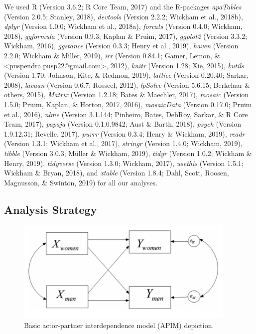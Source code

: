 \documentclass[
  man]{apa6}
\begin{document}
We used R (Version 3.6.2; R Core Team, 2017) and the R-packages \emph{apaTables} (Version 2.0.5; Stanley, 2018), \emph{devtools} (Version 2.2.2; Wickham et al., 2018b), \emph{dplyr} (Version 1.0.0; Wickham et al., 2018a), \emph{forcats} (Version 0.4.0; Wickham, 2018), \emph{ggformula} (Version 0.9.3; Kaplan \& Pruim, 2017), \emph{ggplot2} (Version 3.3.2; Wickham, 2016), \emph{ggstance} (Version 0.3.3; Henry et al., 2019), \emph{haven} (Version 2.2.0; Wickham \& Miller, 2019), \emph{irr} (Version 0.84.1; Gamer, Lemon, \& \textless puspendra.pusp22@gmail.com\textgreater, 2012), \emph{knitr} (Version 1.28; Xie, 2015), \emph{kutils} (Version 1.70; Johnson, Kite, \& Redmon, 2019), \emph{lattice} (Version 0.20.40; Sarkar, 2008), \emph{lavaan} (Version 0.6.7; Rosseel, 2012), \emph{lpSolve} (Version 5.6.15; Berkelaar \& others, 2015), \emph{Matrix} (Version 1.2.18; Bates \& Maechler, 2017), \emph{mosaic} (Version 1.5.0; Pruim, Kaplan, \& Horton, 2017, 2016), \emph{mosaicData} (Version 0.17.0; Pruim et al., 2016), \emph{nlme} (Version 3.1.144; Pinheiro, Bates, DebRoy, Sarkar, \& R Core Team, 2017), \emph{papaja} (Version 0.1.0.9842; Aust \& Barth, 2018), \emph{psych} (Version 1.9.12.31; Revelle, 2017), \emph{purrr} (Version 0.3.4; Henry \& Wickham, 2019), \emph{readr} (Version 1.3.1; Wickham et al., 2017), \emph{stringr} (Version 1.4.0; Wickham, 2019), \emph{tibble} (Version 3.0.3; Müller \& Wickham, 2019), \emph{tidyr} (Version 1.0.2; Wickham \& Henry, 2019), \emph{tidyverse} (Version 1.3.0; Wickham, 2017), \emph{usethis} (Version 1.5.1; Wickham \& Bryan, 2018), and \emph{xtable} (Version 1.8.4; Dahl, Scott, Roosen, Magnusson, \& Swinton, 2019) for all our analyses.

\hypertarget{analysis-strategy}{%
\subsection{Analysis Strategy}\label{analysis-strategy}}

\begin{figure}
\includegraphics[width=400px]{APIM_figure} \caption{Basic actor-partner interdependence model (APIM) depiction.}\label{fig:apim}
\end{figure}
\end{document}
